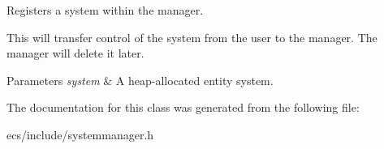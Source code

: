 Registers a system within the manager. 

This will transfer control of the system from the user to the manager. The manager will delete it later.


\begin{DoxyParams}{Parameters}
{\em system} & A heap-\/allocated entity system. \\
\hline
\end{DoxyParams}


The documentation for this class was generated from the following file\-:\begin{DoxyCompactItemize}
\item 
ecs/include/systemmanager.\-h\end{DoxyCompactItemize}
